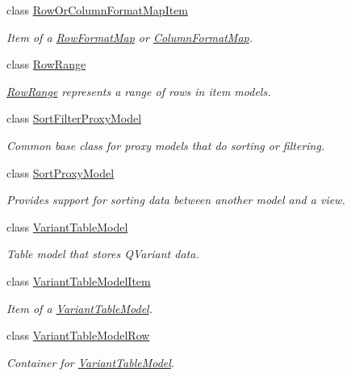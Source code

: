 \begin{DoxyCompactItemize}
class \hyperlink{class_mdt_1_1_item_model_1_1_row_or_column_format_map_item}{Row\+Or\+Column\+Format\+Map\+Item}
\begin{DoxyCompactList}\small\item\em Item of a \hyperlink{class_mdt_1_1_item_model_1_1_row_format_map}{Row\+Format\+Map} or \hyperlink{class_mdt_1_1_item_model_1_1_column_format_map}{Column\+Format\+Map}. \end{DoxyCompactList}\item 
class \hyperlink{class_mdt_1_1_item_model_1_1_row_range}{Row\+Range}
\begin{DoxyCompactList}\small\item\em \hyperlink{class_mdt_1_1_item_model_1_1_row_range}{Row\+Range} represents a range of rows in item models. \end{DoxyCompactList}\item 
class \hyperlink{class_mdt_1_1_item_model_1_1_sort_filter_proxy_model}{Sort\+Filter\+Proxy\+Model}
\begin{DoxyCompactList}\small\item\em Common base class for proxy models that do sorting or filtering. \end{DoxyCompactList}\item 
class \hyperlink{class_mdt_1_1_item_model_1_1_sort_proxy_model}{Sort\+Proxy\+Model}
\begin{DoxyCompactList}\small\item\em Provides support for sorting data between another model and a view. \end{DoxyCompactList}\item 
class \hyperlink{class_mdt_1_1_item_model_1_1_variant_table_model}{Variant\+Table\+Model}
\begin{DoxyCompactList}\small\item\em Table model that stores Q\+Variant data. \end{DoxyCompactList}\item 
class \hyperlink{class_mdt_1_1_item_model_1_1_variant_table_model_item}{Variant\+Table\+Model\+Item}
\begin{DoxyCompactList}\small\item\em Item of a \hyperlink{class_mdt_1_1_item_model_1_1_variant_table_model}{Variant\+Table\+Model}. \end{DoxyCompactList}\item 
class \hyperlink{class_mdt_1_1_item_model_1_1_variant_table_model_row}{Variant\+Table\+Model\+Row}
\begin{DoxyCompactList}\small\item\em Container for \hyperlink{class_mdt_1_1_item_model_1_1_variant_table_model}{Variant\+Table\+Model}. \end{DoxyCompactList}\end{DoxyCompactItemize}
